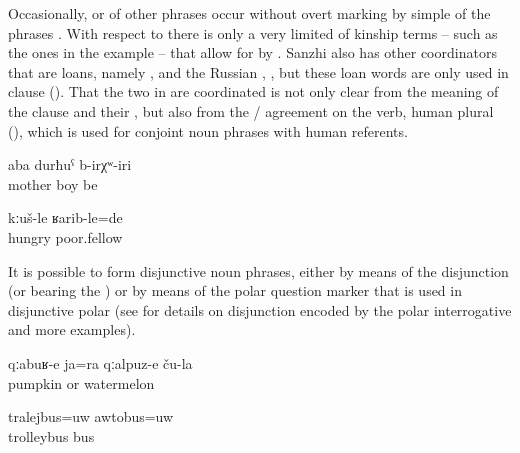 Occasionally,   or  of other phrases occur without overt marking by simple  of the phrases . With respect to  there is only a very limited  of kinship terms – such as the ones in the example  – that allow for  by . Sanzhi also has other coordinators that are loans, namely  , and the Russian   ,  , but these loan words are only used in clause  (). That the two  in  are coordinated is not only clear from the meaning of the clause and their , but also from the / agreement on the verb, human plural (), which is used for conjoint noun phrases with human referents.
%
\begin{exe}
	\ex	\label{ex:There were mother and son}
	\gll	aba	durħuˁ	b-irχʷ-iri\\
		mother	boy	be\\
	\glt	{}

	\ex	\label{ex:‎They were hungry and poor}
	\gll	kːuš-le	ʁarib-le=de\\
		hungry	poor.fellow\\
	\glt	{}
\end{exe}

It is possible to form disjunctive noun phrases, either by means of the disjunction  (or  bearing the )  or by means of the polar question marker   that is used in disjunctive polar  (see  for details on disjunction encoded by the polar interrogative  and more examples).
%
\begin{exe}
	\ex	\label{ex:their pumpkins or watermelons}
	\gll	qːabuʁ-e	ja=ra	qːalpuz-e	ču-la\\
		pumpkin	or	watermelon	\\
	\glt	{}

	\ex	\label{ex:‎a trolleybus or a bus}
	\gll	tralejbus=uw		awtobus=uw	\\
		trolleybus	bus\\
	\glt	{}
\end{exe}

